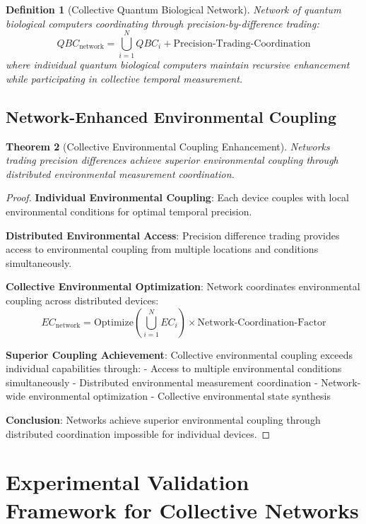 \documentclass[12pt,a4paper]{article}
\newtheorem{theorem}{Theorem}[section]
\newtheorem{definition}[theorem]{Definition}
\begin{document}
\begin{definition}[Collective Quantum Biological Network]
Network of quantum biological computers coordinating through precision-by-difference trading:
$$QBC_{\text{network}} = \bigcup_{i=1}^{N} QBC_i + \text{Precision-Trading-Coordination}$$
where individual quantum biological computers maintain recursive enhancement while participating in collective temporal measurement.
\end{definition}

\subsection{Network-Enhanced Environmental Coupling}

\begin{theorem}[Collective Environmental Coupling Enhancement]
Networks trading precision differences achieve superior environmental coupling through distributed environmental measurement coordination.
\end{theorem}

\begin{proof}
\textbf{Individual Environmental Coupling}: Each device couples with local environmental conditions for optimal temporal precision.

\textbf{Distributed Environmental Access}: Precision difference trading provides access to environmental coupling from multiple locations and conditions simultaneously.

\textbf{Collective Environmental Optimization}: Network coordinates environmental coupling across distributed devices:
$$EC_{\text{network}} = \text{Optimize}\left(\bigcup_{i=1}^{N} EC_i\right) \times \text{Network-Coordination-Factor}$$

\textbf{Superior Coupling Achievement}: Collective environmental coupling exceeds individual capabilities through:
- Access to multiple environmental conditions simultaneously
- Distributed environmental measurement coordination
- Network-wide environmental optimization
- Collective environmental state synthesis

\textbf{Conclusion}: Networks achieve superior environmental coupling through distributed coordination impossible for individual devices.
\end{proof}

\section{Experimental Validation Framework for Collective Networks}
\end{document}
